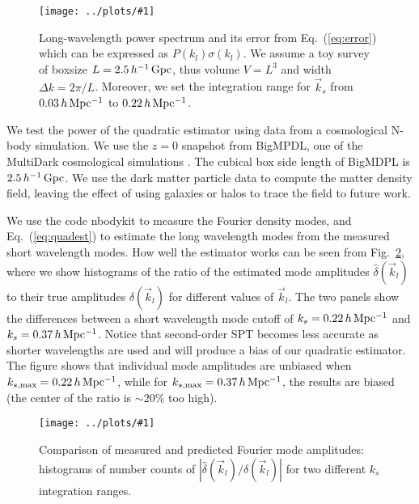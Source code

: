 \documentclass[prd,amsmath,amssymb,floatfix,superscriptaddress,nofootinbib,twocolumn]{revtex4-1}
\newcommand{\vk}{\vec{k}}
\newcommand{\ec}[1]{Eq.~(\ref{eq:#1})}
\newcommand{\rf}[1]{\ref{fig:#1}}
\newcommand{\sfig}[2]{
\texttt{[image: ../plots/\#1]}
        }
\newcommand{\Sfig}[2]{
   \begin{figure}[thbp]
   \begin{center}
    \sfig{../plots/#1.pdf}{\columnwidth}
    \caption{{\small #2}}
    \label{fig:#1}
     \end{center}
   \end{figure}
}
\begin{document}
\Sfig{SN}{Long-wavelength power spectrum and its error from \ec{error} which can be expressed as $P(k_l)\sigma(k_l)$. We assume a toy survey of boxsize $L=2.5\, h^{-1}\rm\, Gpc$, thus volume $V=L^3$ and width $\Delta k = 2\pi/L$. Moreover, we set the integration range for $\vk_s$ from $0.03 \,h \,\rm Mpc^{-1}$ to $0.22\,h\,\rm Mpc^{-1}$.}


\label{sec3}
We test the power of the quadratic estimator using data from a cosmological N-body simulation. We use the $z=0$ snapshot from BigMPDL, one of the MultiDark cosmological simulations \cite{Klypin:2014nov}. The cubical box side length of BigMDPL is $2.5\,h^{-1}\,\rm Gpc$. We use the dark matter particle data to compute the matter density field, leaving the effect of using galaxies or halos to trace the field \cite{Desjacques:2018rev} to  future work.

We use the code nbodykit \cite{Hand:2018nby} to measure the Fourier density modes, and \ec{quadest} to estimate the long wavelength modes  from the measured short wavelength modes. How well the estimator works can be seen from Fig.~\rf{hist}, where we show histograms of the ratio of the estimated mode amplitudes $\hat{\delta}(\vk_l)$ to their true amplitudes $\delta(\vk_l)$ for different values of $\vk_l$. The two panels show the differences between a short wavelength mode cutoff of $k_s=0.22\, h\, \rm Mpc^{-1}$ and  $k_s=0.37\,h\, \rm Mpc^{-1}$. Notice that second-order SPT becomes less accurate as shorter wavelengths are used and will produce a bias of our quadratic estimator. The figure shows that individual mode amplitudes are  unbiased when $k_{s,\rm max}= 0.22\,h\, \rm Mpc^{-1}$, while for $k_{s,\rm max}=0.37\,h\, \rm Mpc^{-1}$, the results are biased (the center of the ratio is $\sim 20 \%$ too high).
\Sfig{hist}{Comparison of measured and predicted Fourier mode amplitudes: histograms of number counts of $|\hat{\delta}(\vk_l)/\delta(\vk_l)|$ for two different $k_s$ integration ranges.}
\end{document}
